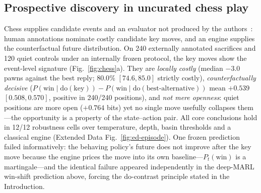 \documentclass[11pt]{article}
\theoremstyle{definition}
\newcommand{\dO}[1]{\mathrm{do}(#1)}
\begin{document}
\subsection*{Prospective discovery in uncurated chess play}
\label{sec:chess}

Chess supplies candidate events and an evaluator not produced by the
authors~\cite{mcgrath2022,silver2018}: human annotations nominate
costly candidate key moves, and an engine supplies the counterfactual
future distribution. On 240 externally annotated sacrifices and 120
quiet controls under an internally frozen protocol, the key moves show
the event-level signature (Fig.~\ref{fig:chess}a). They are
\emph{locally costly} (median $-3.0$ pawns against the best reply;
$80.0\%$ $[74.6, 85.0]$ strictly costly), \emph{counterfactually
decisive} ($P(\text{win} \mid \dO{\text{key}}) - P(\text{win} \mid
\dO{\text{best-alternative}})$ mean $+0.539$ $[0.508, 0.570]$, positive
in 240/240 positions), and \emph{not mere openness}: quiet positions
are more open ($+0.764$ bits) yet no single move usefully collapses
them---the opportunity is a property of the state--action pair. All
core conclusions hold in 12/12 robustness cells over temperature,
depth, basin thresholds and a classical engine (Extended Data
Fig.~\ref{fig:ed-episode}). One frozen prediction failed
informatively: the behaving policy's future does not improve after the
key move because the engine prices the move into its own
baseline---$P_t(\text{win})$ is a martingale---and the identical
failure appeared independently in the deep-MARL win-shift prediction
above, forcing the do-contrast
principle stated in the Introduction.
\end{document}
